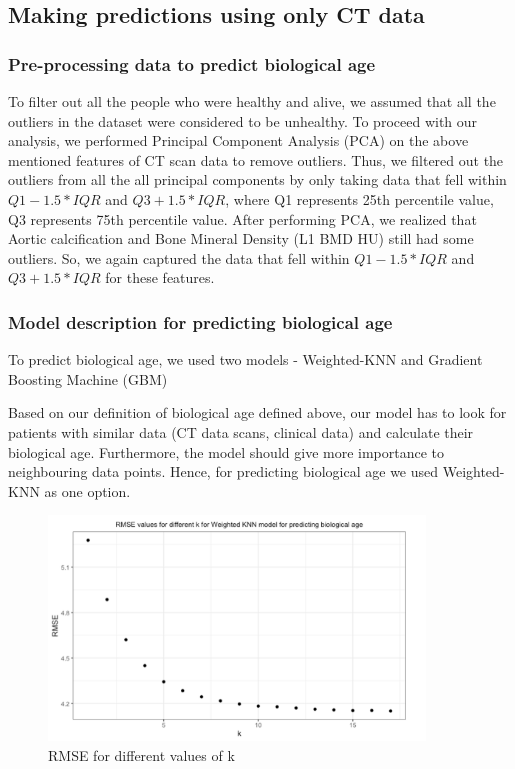 \documentclass{article}
\begin{document}
\subsection{Making predictions using only CT data}

\subsubsection{Pre-processing data to predict biological age}
\label{sec:two}
To filter out all the people who were healthy and alive, we assumed that all the outliers in the dataset were considered to be unhealthy. To proceed with our analysis, we performed Principal Component Analysis (PCA) on the above mentioned features of CT scan data to remove outliers. Thus, we filtered out the outliers from all the all principal components by only taking data that fell within $Q1 - 1.5 * IQR$ and $Q3 + 1.5 * IQR$, where Q1 represents 25th percentile value, Q3 represents 75th percentile value. After performing PCA, we realized that Aortic calcification and Bone Mineral Density (L1 BMD HU) still had some outliers. So, we again captured the data that fell within $Q1 - 1.5 * IQR$ and $Q3 + 1.5 * IQR$ for these features. 


\subsubsection{Model description for predicting biological age}
\label{sec:one}
To predict biological age, we used two models - Weighted-KNN and Gradient Boosting Machine (GBM)

Based on our definition of biological age defined above, our model has to look for patients with similar data (CT data scans, clinical data) and calculate their biological age. Furthermore, the model should give more importance to neighbouring data points. Hence, for predicting biological age we used Weighted-KNN as one option. 

\begin{figure}[h]
\centering
\includegraphics[width=10cm]{fig1-3}
\caption{RMSE for different values of k}
\end{figure}
\end{document}
